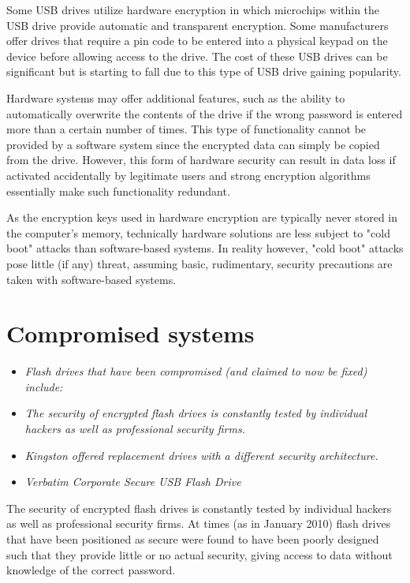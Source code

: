 Some USB drives utilize hardware encryption in which microchips within
the USB drive provide automatic and transparent encryption. Some
manufacturers offer drives that require a pin code to be entered into a
physical keypad on the device before allowing access to the drive. The
cost of these USB drives can be significant but is starting to fall due
to this type of USB drive gaining popularity.

Hardware systems may offer additional features, such as the ability to
automatically overwrite the contents of the drive if the wrong password
is entered more than a certain number of times. This type of
functionality cannot be provided by a software system since the
encrypted data can simply be copied from the drive. However, this form
of hardware security can result in data loss if activated accidentally
by legitimate users and strong encryption algorithms essentially make
such functionality redundant.

As the encryption keys used in hardware encryption are typically never
stored in the computer's memory, technically hardware solutions are less
subject to "cold boot" attacks than software-based systems. In reality
however, "cold boot" attacks pose little (if any) threat, assuming
basic, rudimentary, security precautions are taken with software-based
systems.

\section{Compromised systems}\label{compromised-systems}

\begin{itemize}
\item
  \emph{Flash drives that have been compromised (and claimed to now be
  fixed) include:}
\item
  \emph{The security of encrypted flash drives is constantly tested by
  individual hackers as well as professional security firms.}
\item
  \emph{Kingston offered replacement drives with a different security
  architecture.}
\item
  \emph{Verbatim Corporate Secure USB Flash Drive}
\end{itemize}

The security of encrypted flash drives is constantly tested by
individual hackers as well as professional security firms. At times (as
in January 2010) flash drives that have been positioned as secure were
found to have been poorly designed such that they provide little or no
actual security, giving access to data without knowledge of the correct
password.


